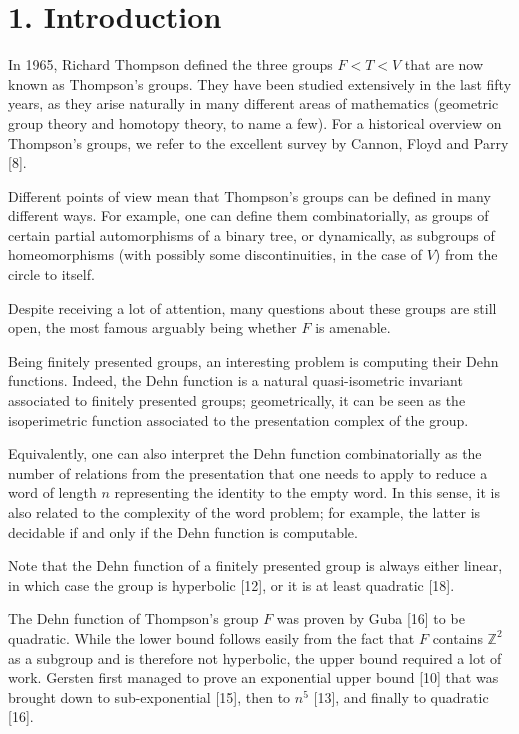\documentclass[10pt,a4paper]{article}
\begin{document}
\section*{1. Introduction}
In 1965, Richard Thompson defined the three groups $F<T<V$ that are now known as Thompson's groups. They have been studied extensively in the last fifty years, as they arise naturally in many different areas of mathematics (geometric group theory and homotopy theory, to name a few). For a historical overview on Thompson's groups, we refer to the excellent survey by Cannon, Floyd and Parry [8].

Different points of view mean that Thompson's groups can be defined in many different ways. For example, one can define them combinatorially, as groups of certain partial automorphisms of a binary tree, or dynamically, as subgroups of homeomorphisms (with possibly some discontinuities, in the case of $V$) from the circle to itself.

Despite receiving a lot of attention, many questions about these groups are still open, the most famous arguably being whether $F$ is amenable.

Being finitely presented groups, an interesting problem is computing their Dehn functions. Indeed, the Dehn function is a natural quasi-isometric invariant associated to finitely presented groups; geometrically, it can be seen as the isoperimetric function associated to the presentation complex of the group.

Equivalently, one can also interpret the Dehn function combinatorially as the number of relations from the presentation that one needs to apply to reduce a word of length $n$ representing the identity to the empty word. In this sense, it is also related to the complexity of the word problem; for example, the latter is decidable if and only if the Dehn function is computable.

Note that the Dehn function of a finitely presented group is always either linear, in which case the group is hyperbolic [12], or it is at least quadratic [18].

The Dehn function of Thompson's group $F$ was proven by Guba [16] to be quadratic. While the lower bound follows easily from the fact that $F$ contains $\mathbb{Z}^2$ as a subgroup and is therefore not hyperbolic, the upper bound required a lot of work. Gersten first managed to prove an exponential upper bound [10] that was brought down to sub-exponential [15], then to $n^5$ [13], and finally to quadratic [16].
\end{document}
